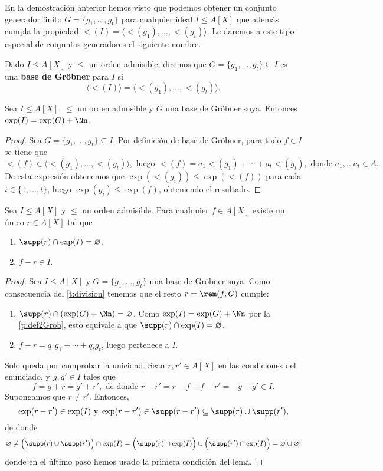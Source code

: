 En la demostración anterior hemos visto que podemos obtener un conjunto generador finito $G=\{g_1,\dots, g_t\}$ para cualquier ideal $I\le A[X]$ que además cumpla la propiedad $\lt(I) = \langle \lt(g_1),\dots, \lt(g_t)\rangle$. Le daremos a este tipo especial de conjuntos generadores el siguiente nombre.
\begin{definicion}
    Dado $I\le A[X]$ y $\le$ un orden admisible, diremos que $G = \{g_1,\dots, g_t\}\subseteq I$ es una \textbf{base de Gröbner} para $I$ si 
    $$\langle \lt(I)\rangle = \langle \lt(g_1),\dots, \lt(g_t) \rangle.$$
\end{definicion}
\begin{proposicion}\label{p:def2Grob}
    Sea $I\le A[X]$, $\le$ un orden admisible y $G$ una base de Gröbner suya. Entonces $\exp(I) = \exp(G) + \Nn$.
\end{proposicion}
\begin{proof}
    Sea $G=\{g_1,\dots, g_t\} \subseteq I$. Por definición de base de Gröbner, para todo $f\in I$ se tiene que
    $$\lt(f) \in \langle \lt(g_1),\dots, \lt(g_t)\rangle, \text{ luego } \lt(f) = a_1\lt(g_1) + \cdots + a_t\lt(g_t), \text{ donde } a_1,\dots a_t\in A.$$
    De esta expresión obtenemos que $\exp(\lt(g_i))\le \exp(\lt(f))$ para cada $i\in \{1,\dots, t\}$, luego $\exp(g_i) \le \exp(f)$, obteniendo el resultado.
\end{proof}
\begin{proposicion}\label{p:unicoR}
    Sea $I\le A[X]$ y $\le$ un orden admisible. Para cualquier $f\in A[X]$ existe un único $r\in A[X]$ tal que
    \begin{enumerate}
        \item $\supp(r)\cap \exp(I) = \varnothing$,
        \item $f-r\in I$.
    \end{enumerate}
\end{proposicion}
\begin{proof}    
    Sea $I\le A[X]$ y $G=\{g_1,\dots, g_t\}$ una base de Gröbner suya. Como consecuencia del \autoref{t:division} tenemos que el resto $r=\rem(f,G)$ cumple:
    \begin{enumerate}
        \item $\supp(r) \cap (\exp(G)+\Nn) = \varnothing$. Como $\exp(I) = \exp(G)+\Nn$ por la \autoref{p:def2Grob}, esto equivale a que $\supp(r) \cap \exp(I) = \varnothing$.
        \item $f-r=q_1g_1 + \cdots + q_tg_t$, luego pertenece a $I$. 
    \end{enumerate}
    Solo queda por comprobar la unicidad. Sean $r,r' \in A[X]$ en las condiciones del enunciado, y $g,g' \in I$ tales que 
    $$f=g+r=g'+r', \text{ de donde } r-r' = r-f+f-r' = -g+g' \in I.$$
    Supongamos que $r\neq r'$. Entonces,
    $$\exp(r-r') \in \exp(I) \text{ y } \exp(r-r') \in \supp(r-r')\subseteq \supp(r)\cup \supp(r'),$$
    de donde
    \begin{equation*}
        \varnothing \neq \Big( \supp(r) \cup \supp(r') \Big) \cap \exp(I) = \Big( \supp(r) \cap \exp(I)\Big) \cup \Big( \supp(r') \cap \exp(I)\Big) = \varnothing \cup \varnothing,
    \end{equation*}
    donde en el último paso hemos usado la primera condición del lema.
\end{proof}
